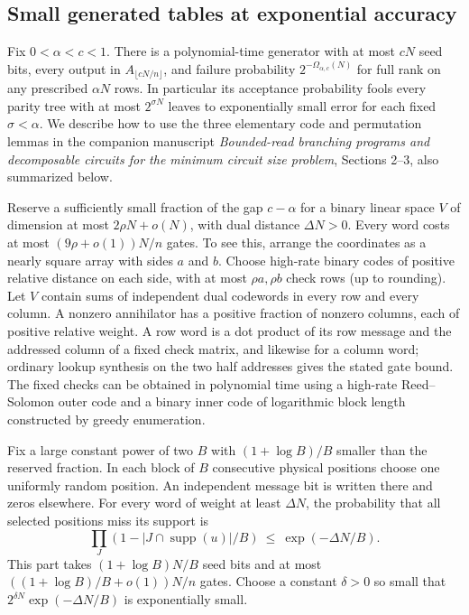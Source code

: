 \subsection{Small generated tables at exponential accuracy}
Fix $0<\alpha<c<1$. There is a polynomial-time generator with at most $cN$ seed bits, every output in $A_{\lfloor cN/n\rfloor}$, and failure probability $2^{-\Omega_{\alpha,c}(N)}$ for full rank on any prescribed $\alpha N$ rows. In particular its acceptance probability fools every parity tree with at most $2^{\sigma N}$ leaves to exponentially small error for each fixed $\sigma<\alpha$. We describe how to use the three elementary code and permutation lemmas in the companion manuscript \emph{Bounded-read branching programs and decomposable circuits for the minimum circuit size problem}, Sections 2--3, also summarized below.

Reserve a sufficiently small fraction of the gap $c-\alpha$ for a binary linear space $V$ of dimension at most $2\rho N+o(N)$, with dual distance $\Delta N>0$. Every word costs at most $(9\rho+o(1))N/n$ gates. To see this, arrange the coordinates as a nearly square array with sides $a$ and $b$. Choose high-rate binary codes of positive relative distance on each side, with at most $\rho a,\rho b$ check rows (up to rounding). Let $V$ contain sums of independent dual codewords in every row and every column. A nonzero annihilator has a positive fraction of nonzero columns, each of positive relative weight. A row word is a dot product of its row message and the addressed column of a fixed check matrix, and likewise for a column word; ordinary lookup synthesis on the two half addresses gives the stated gate bound. The fixed checks can be obtained in polynomial time using a high-rate Reed--Solomon outer code and a binary inner code of logarithmic block length constructed by greedy enumeration.

Fix a large constant power of two $B$ with $(1+\log B)/B$ smaller than the reserved fraction. In each block of $B$ consecutive physical positions choose one uniformly random position. An independent message bit is written there and zeros elsewhere. For every word of weight at least $\Delta N$, the probability that all selected positions miss its support is
\[
               \prod_J(1-|J\cap\operatorname{supp}(u)|/B)
                        \ \le\ \exp(-\Delta N/B).
\]
This part takes $(1+\log B)N/B$ seed bits and at most $((1+\log B)/B+o(1))N/n$ gates. Choose a constant $\delta>0$ so small that $2^{\delta N}\exp(-\Delta N/B)$ is exponentially small.

